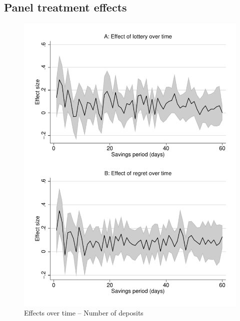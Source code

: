 \documentclass[11pt]{article}
\begin{document}
	\clearpage

	\subsection{Panel treatment effects}

        \begin{figure}[ht]
        \centering
        \caption{Effects over time -- Number of deposits}
        \includegraphics[width=\textwidth]{../../figures/line-timemobile_deposits.pdf}
        \end{figure}
\end{document}
